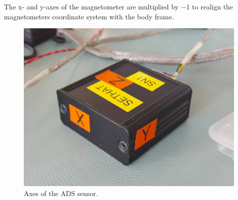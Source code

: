 The x- and y-axes of the magnetometer are multiplied by $-1$ to realign the magnetometers coordinate system with the body frame.


\begin{figure}[H]
    \centering
    \includegraphics[width=0.8\linewidth]{images/03_data/ads_sensor_axes.jpg}
    \caption{Axes of the \ac{ADS} sensor.}
    \label{fig:body_frame}
\end{figure}

